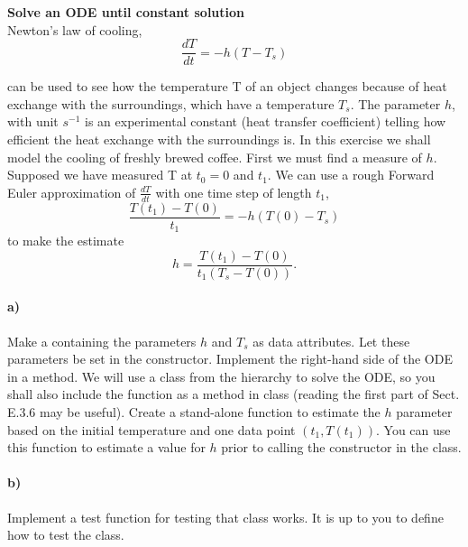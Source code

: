 \begin{Problem}{\textbf{Solve an ODE until constant solution}}\\
\noindent
Newton's law of cooling,
\begin{equation*}
  \frac{dT}{dt} = -h(T-T_s)  
\end{equation*}

can be used to see how the temperature T of an object changes because of heat exchange with the surroundings, which have a temperature $T_s$. The parameter $h$, with unit $s^{-1}$ is an experimental constant (heat transfer coefficient) telling how efficient the heat exchange with the surroundings is. In this exercise we shall model the cooling of freshly brewed coffee. First we must find a measure of $h$. Supposed we have measured T at $t_0=0$ and $t_1$. We can use a rough Forward Euler approximation of $\frac{dT}{dt}$ with one time step of length $t_1$,
\begin{equation*}
   \frac{T(t_1)-T(0)}{t_1} = -h(T(0)-T_s) 
\end{equation*}
to make the estimate
\begin{equation*}
   h = \frac{T(t_1)-T(0)}{t_1(T_s-T(0))}. 
\end{equation*}

\paragraph{a)} 
Make a  containing the parameters $h$ and $T_s$ as data attributes. Let these parameters be set in the constructor. Implement the right-hand side of the ODE in a  method. We will use a class from the  hierarchy to solve the ODE, so you shall also include the  function as a method in class  (reading the first part of Sect. E.3.6 may be useful). \newline
Create a stand-alone function  to estimate the $h$ parameter based on the initial temperature and one data point $(t_1, T(t_1))$. You can use this function to estimate a value for $h$ prior to calling the constructor in the  class.

\paragraph{b)}
Implement a test function  for testing that class  works. It is up to you to define how to test the class.


\end{Problem}
